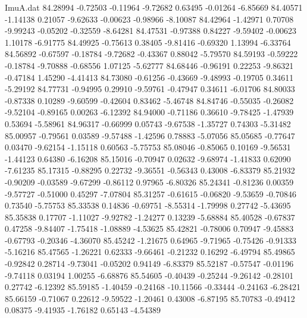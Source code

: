 \begin{filecontents}{ImuA.dat}
  84.28994   -0.72503   -0.11964   -9.72682    0.63495   -0.01264   -6.85669
  84.40571   -1.14138    0.21057   -9.62633   -0.00623   -0.98966   -8.10087
  84.42964   -1.42971    0.70708   -9.99243   -0.05202   -0.32559   -8.64281
  84.47531   -0.97388    0.84227   -9.59402   -0.00623    1.10178   -6.91775
  84.49925   -0.75613    0.38405   -9.81416   -0.69320    1.13994   -6.33764
  84.56892   -0.67597   -0.18784   -9.72682   -0.43367    0.88042   -5.79570
  84.59193   -0.59222   -0.18784   -9.70888   -0.68556    1.07125   -5.62777
  84.68446   -0.96191    0.22253   -9.86321   -0.47184    1.45290   -4.41413
  84.73080   -0.61256   -0.43669   -9.48993   -0.19705    0.34611   -5.29192
  84.77731   -0.94995    0.29910   -9.59761   -0.47947    0.34611   -6.01706
  84.80033   -0.87338    0.10289   -9.60599   -0.42604    0.83462   -5.46748
  84.84746   -0.55035   -0.26082   -9.52104   -0.89165    0.00263   -6.12392
  84.94000   -0.71186    0.36610   -9.78425   -1.47939    0.53694   -5.58961
  84.96317   -0.66999    0.05743   -9.67538   -1.35727    0.74303   -5.31482
  85.00957   -0.79561    0.03589   -9.57488   -1.42596    0.78883   -5.07056
  85.05685   -0.77647    0.03470   -9.62154   -1.15118    0.60563   -5.75753
  85.08046   -0.85065    0.10169   -9.56531   -1.44123    0.64380   -6.16208
  85.15016   -0.70947    0.02632   -9.68974   -1.41833    0.62090   -7.61235
  85.17315   -0.88295    0.22732   -9.36551   -0.56343    0.43008   -6.83379
  85.21932   -0.90209   -0.03589   -9.67299   -0.86112    0.97965   -6.80326
  85.24341   -0.81236    0.00359   -9.57727   -0.51000    0.45297   -7.07804
  85.31257   -0.61615   -0.06820   -9.53659   -0.70846    0.73540   -5.75753
  85.33538    0.14836   -0.69751   -8.55314   -1.79998    0.27742   -5.43695
  85.35838    0.17707   -1.11027   -9.92782   -1.24277    0.13239   -5.68884
  85.40528   -0.67837    0.47258   -9.84407   -1.75418   -1.08889   -4.53625
  85.42821   -0.78006    0.70947   -9.45883   -0.67793   -0.20346   -4.36070
  85.45242   -1.21675    0.64965   -9.71965   -0.75426   -0.91333   -5.16216
  85.47565   -1.26221    0.62333   -9.66461   -0.21232    0.16292   -6.49794
  85.49865   -0.92842    0.28714   -9.73041   -0.05202    0.94149   -6.83379
  85.52187   -0.57547   -0.01196   -9.74118    0.03194    1.00255   -6.68876
  85.54605   -0.40439   -0.25244   -9.26142   -0.28101    0.27742   -6.12392
  85.59185   -1.40459   -0.24168  -10.11566   -0.33444   -0.24163   -6.28421
  85.66159   -0.71067    0.22612   -9.59522   -1.20461    0.43008   -6.87195
  85.70783   -0.49412    0.08375   -9.41935   -1.76182    0.65143   -4.54389

\end{filecontents}
